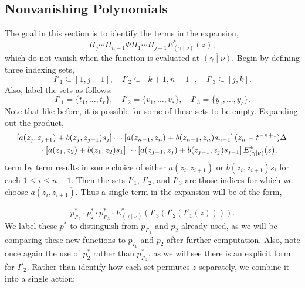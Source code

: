 \documentclass[ALCO]{cedram}
\newcommand{\Estar}[1]{E^*_{#1}}
\newcommand{\gammanu}{{(\gamma \mid \nu)}}
\newcommand{\pstarone}{p^*_{I'_1}}
\newcommand{\pstartwo}{p^*_2}
\newcommand{\pstarthree}{p^*_{I'_3}}
\begin{document}
\subsection{Nonvanishing Polynomials}
The goal in this section is to identify the terms in the expansion,
\[ H_j \dotsm H_{n-1} \Phi H_1 \dotsm H_{j-1} \Estar{\gammanu}(z),\]
which do not vanish when the function is evaluated at $\overline{\gammanu}$. Begin by defining three indexing sets,
\[ I'_1 \subseteq [1,j-1], \quad I'_2 \subseteq [k+1,n-1], \quad I'_3 \subseteq [j,k]. \]
Also, label the sets as follows:
\[ I'_1 = \{t_1, \dotsc, t_r\}, \quad I'_2 = \{v_1, \dotsc, v_s\}, \quad I'_3 = \{y_1, \dotsc, y_c\}.\]
Note that like before, it is possible for some of these sets to be empty. Expanding out the product,
\begin{align*} &  [a(z_j,z_{j+1})+b(z_j,z_{j+1}) s_j] \dotsm [a(z_{n-1},z_n)+b(z_{n-1},z_n) s_{n-1}]\,    (z_n-t^{-n+1})\Delta \, \\& \hspace*{1cm} \cdot [a(z_1, z_2)+b(z_1,z_2) s_1] \dotsm [a(z_{j-1},z_{j}) + b(z_{j-1},z_{j})s_{j-1}] \, \Estar{\gammanu}(z),
\end{align*}
term by term results in some choice of either $a(z_i,z_{i+1})$ or $b(z_i,z_{i+1}) s_i$ for each $1\leq i \leq n-1$. Then the sets $I'_1$, $I'_2$, and $I'_3$ are those indices for which we choose $a(z_i,z_{i+1})$. Thus a single term in the expansion will be of the form,

\[ \pstarone \cdot \pstartwo \cdot \pstarthree \cdot \Estar{\gammanu}\left(I'_3(I'_2(I'_1(z))) \right).\]
We label these $p^*$ to distinguish from $p_{I'_1}$ and $p_{2}$ already used, as we will be comparing these new functions to $p_{I_1}$ and $p_2$ after further computation. Also, note once again the use of $\pstartwo$ rather than $p^*_{I'_2}$, as we will see there is an explicit form for $I'_2$. Rather than identify how each set permutes $z$ separately, we combine it into a single action:
\end{document}
